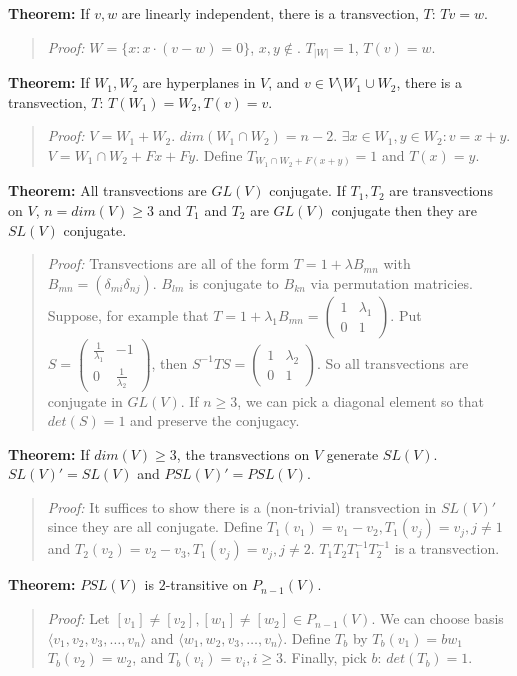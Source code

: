 {\bf Theorem:} If $v, w$ are linearly independent, there is a transvection, $T$: $Tv = w$.
\begin{quote}
\emph{Proof:} $W = \{x: x \cdot (v-w) = 0 \}$, $x, y \notin $. $T_{|W|} = 1$, $T(v)=w$.
\end{quote}
{\bf Theorem:} If $W_1, W_2$ are hyperplanes in $V$, and $v \in V \setminus W_1 \cup W_2$,
there is a transvection, $T$: $T(W_1)= W_2, T(v) = v$.
\begin{quote}
\emph{Proof:} $V = W_1 + W_2$.  $dim(W_1 \cap W_2)= n-2$.  $\exists x \in W_1, y \in W_2: v = x + y$.
$V= W_1 \cap W_2 + Fx + Fy$.  Define $T_{W_1 \cap W_2 + F(x + y)} = 1$ and $T(x) = y$.
\end{quote}
{\bf Theorem:} All transvections are $GL(V)$ conjugate.
If $T_1, T_2$ are transvections on $V$, $n=dim(V) \ge 3$ and $T_1$ and $T_2$ are
$GL(V)$ conjugate then they are $SL(V)$ conjugate.  
\begin{quote}
\emph{Proof:} Transvections are all of the form $T = 1 + \lambda B_{mn}$ with
$B_{mn} = (\delta_{mi} \delta_{nj})$. $B_{lm}$ is conjugate to $B_{kn}$ via permutation
matricies.  Suppose, for example that $T= 1 + \lambda_1 B_{mn} =
\left(
\begin{array}{cc}
1 & \lambda_1 \\
0 & 1
\end{array}
\right)$.
Put $S = \left(
\begin{array}{cc}
{\frac 1 {\lambda_1}} & -1 \\
0 & {\frac 1 {\lambda_2}}
\end{array}
\right)$, then 
$S^{-1} T S =
\left(
\begin{array}{cc}
1 & \lambda_2 \\
0 & 1
\end{array}
\right)$.  So all transvections are conjugate in $GL(V)$.  If $n \geq 3$, we can pick a diagonal
element so that $det(S) = 1$ and preserve the conjugacy.
\end{quote}
{\bf Theorem:} If $dim(V) \ge 3$, the transvections on $V$ generate $SL(V)$.  $SL(V)'=SL(V)$
and $PSL(V)'=PSL(V)$.
\begin{quote}
\emph{Proof:} It suffices to show there is a (non-trivial) transvection in $SL(V)'$ since they are
all conjugate.
Define $T_1(v_1) = v_1 - v_2, T_1(v_j) = v_j, j \ne 1$ and
$T_2(v_2) = v_2 - v_3, T_1(v_j) = v_j, j \ne 2$. $T_1 T_2 T_1^{-1}T_2^{-1}$ is a transvection.
\end{quote}
{\bf Theorem:} $PSL(V)$ is $2$-transitive on $P_{n-1}(V)$.
\begin{quote}
\emph{Proof:} Let $[v_1] \ne [v_2], [w_1] \ne [w_2] \in P_{n-1}(V)$.
We can choose basis
$\langle v_1, v_2, v_3, \ldots , v_n \rangle$ and
$\langle w_1, w_2, v_3, \ldots , v_n \rangle$.  Define $T_b$ by
$T_b(v_1) = b w_1$
$T_b(v_2) = w_2$, and
$T_b(v_i) = v_i, i \geq 3$.  Finally, pick $b$: $det(T_b) = 1$.
\end{quote}
